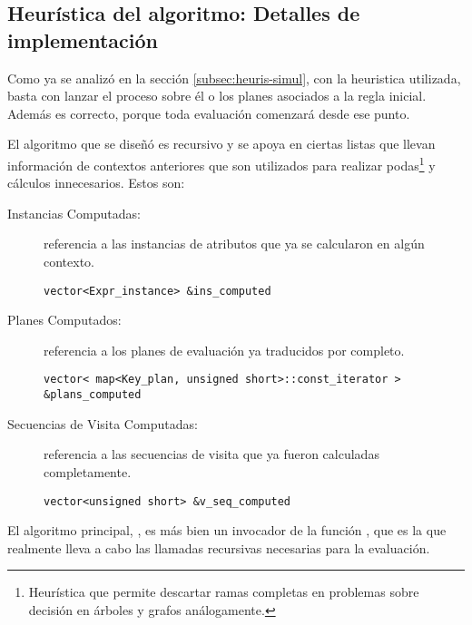 \subsection{Heurística del algoritmo: Detalles de implementación}

Como ya se analizó en la sección \ref{subsec:heuris-simul}, con la heuristica utilizada, basta con lanzar el proceso sobre él o los planes asociados a la regla inicial. Además es correcto, porque toda evaluación comenzará desde ese punto.

El algoritmo que se diseñó es recursivo y se apoya en ciertas listas que llevan información de contextos anteriores que son utilizados para realizar podas\footnote{Heurística que permite descartar ramas completas en problemas sobre decisión en árboles y grafos análogamente. } y cálculos innecesarios. Estos son:

\begin{description}
\item [Instancias Computadas:] referencia a las instancias de atributos que ya se calcularon en algún contexto.
\begin{lstlisting}
vector<Expr_instance> &ins_computed
\end{lstlisting}

\item [Planes Computados:] referencia a los planes de evaluación ya traducidos por completo.
\begin{lstlisting}
vector< map<Key_plan, unsigned short>::const_iterator > &plans_computed
\end{lstlisting}

\item [Secuencias de Visita Computadas:] referencia a las secuencias de visita que ya fueron calculadas completamente.
\begin{lstlisting}
vector<unsigned short> &v_seq_computed
\end{lstlisting}
\end{description}

El algoritmo principal, , es más bien un invocador de la función , que es la que realmente lleva a cabo las llamadas recursivas necesarias para la evaluación.

